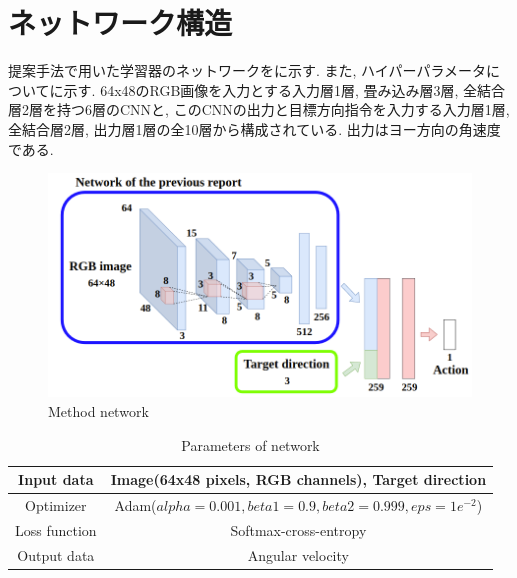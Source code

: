 
\section{ネットワーク構造}
提案手法で用いた学習器のネットワークをに示す. また, ハイパーパラメータについてに示す. 64x48のRGB画像を入力とする入力層1層, 畳み込み層3層, 全結合層2層を持つ6層のCNNと, このCNNの出力と目標方向指令を入力する入力層1層, 全結合層2層, 出力層1層の全10層から構成されている. 出力はヨー方向の角速度である.

\begin{figure}[hbtp]
  \centering
 \includegraphics[keepaspectratio, scale=0.43]
      {images/network_structure2.png}
 \caption{Method network}
 \label{Fig:network_structure}
\end{figure}

\begin{table}[hbtp]
  \caption{Parameters of network}
  \label{table:param1}
  \centering
  \begin{tabular}{|c|c|}
    \hline
    Input data & Image(64x48 pixels, RGB channels), Target direction \\
    \hline
    Optimizer & Adam($alpha = 0.001, beta1 = 0.9, beta2 =  0.999, eps = 1e^{-2}$)\\
    \hline
    Loss function & Softmax-cross-entropy\\
    \hline
    Output data & Angular velocity\\
    \hline
  \end{tabular}
\end{table}


\newpage
